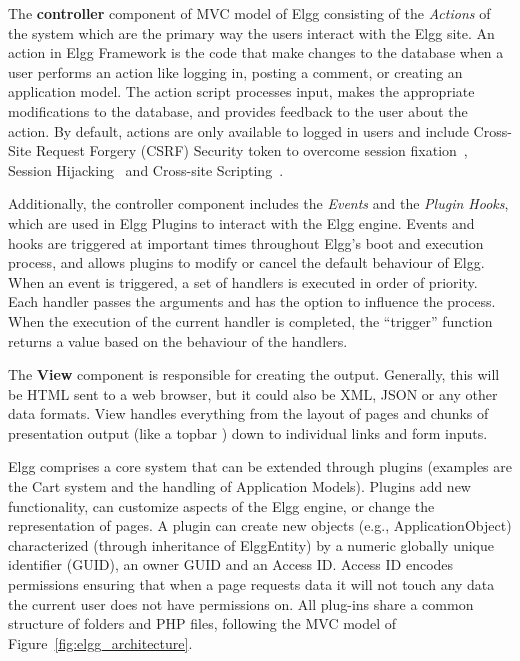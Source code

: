 The {\bf controller} component of MVC model of Elgg consisting of the \emph{Actions} of the system which are the primary way the users interact with the Elgg site. An action in Elgg Framework is the code that make changes to the database when a user performs an action like logging in, posting a comment, or creating an application model. The action script processes input, makes the appropriate modifications to the database, and provides feedback to the user about the action. By default, actions are only available to logged in users and include Cross-Site Request Forgery (CSRF) Security token to overcome session fixation~\cite{kolvsek2002session}, Session Hijacking~\cite{burgersposter} and Cross-site Scripting~\cite{thamescomparing}.

Additionally, the controller component includes the \emph{Events} and the \emph{Plugin Hooks}, which are used in Elgg Plugins to interact with the Elgg engine. Events and hooks are triggered at important times throughout Elgg’s boot and execution process, and allows plugins to modify or cancel the default behaviour of Elgg. When an event is triggered, a set of handlers is executed in order of priority. Each handler passes the arguments and has the option to influence the process. When the execution of the current handler is completed, the ``trigger'' function returns a value based on the behaviour of the handlers.

The {\bf View} component is responsible for creating the output. Generally, this will be HTML sent to a web browser, but it could also be XML, JSON or any other data formats. View handles everything from the layout of pages and chunks of presentation output (like a topbar ) down to individual links and form inputs.

Elgg comprises a core system that can be extended through plugins (examples are the Cart system and the handling of Application Models). Plugins add new functionality, can customize aspects of the Elgg engine, or change the representation of pages.
A plugin can create new objects (e.g., ApplicationObject) characterized (through inheritance of ElggEntity) by a numeric globally unique identifier (GUID), an owner GUID and an Access ID. Access ID encodes permissions ensuring that when a page requests data it will not touch any data the current user does not have permissions on. All plug-ins share a common structure of folders and PHP files, following the MVC model of Figure~\ref{fig:elgg_architecture}.  

